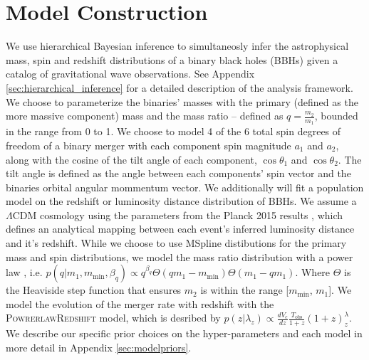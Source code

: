 \section{Model Construction}

We use hierarchical Bayesian inference to simultaneosly infer the astrophysical mass, spin and redshift distributions of 
a binary black holes (BBHs) given a catalog of gravitational wave observations. See Appendix \ref{sec:hierarchical_inference} for a detailed 
description of the analysis framework. We choose to parameterize the binaries' masses with the primary (defined as the more massive component) mass 
and the mass ratio -- defined as $q=\frac{m_2}{m_1}$, bounded in the range from 0 to 1. We choose to model 4 of the 6 total 
spin degrees of freedom of a binary merger with each component spin magnitude $a_1$ and $a_2$, along with the cosine of the tilt angle of each component, 
$\cos{\theta_1}$ and $\cos{\theta_2}$. The tilt angle is defined as the angle between each components' spin vector and the binaries orbital angular mommentum vector. 
We additionally will fit a population model on the redshift or luminosity distance distribution of BBHs. We assume a $\Lambda\mathrm{CDM}$ cosmology using the 
parameters from the Planck 2015 results , which defines an analytical mapping between each event's inferred
luminosity distance and it's redshift. While we choose to use MSpline distibutions for the primary mass and spin distributions, we 
model the mass ratio distribution with a power law , i.e. $p(q | m_1, m_\mathrm{min}, \beta_q) \propto q^{\beta_q} \Theta(qm_1 - m_\mathrm{min}) \Theta(m_1 - qm_1)$. 
Where $\Theta$ is the Heaviside step function that ensures $m_2$ is within the range [$m_\mathrm{min}$, $m_1$].
We model the evolution of the merger rate with redshift with the \textsc{PowrerlawRedshift}  model, which is desribed by 
$p(z|\lambda_z)\propto \frac{dV_c}{dz} \frac{T_\mathrm{obs}}{1+z} (1+z)^\lambda_z$. We describe our specific prior choices on the hyper-parameters and each model 
in more detail in Appendix \ref{sec:modelpriors}. 